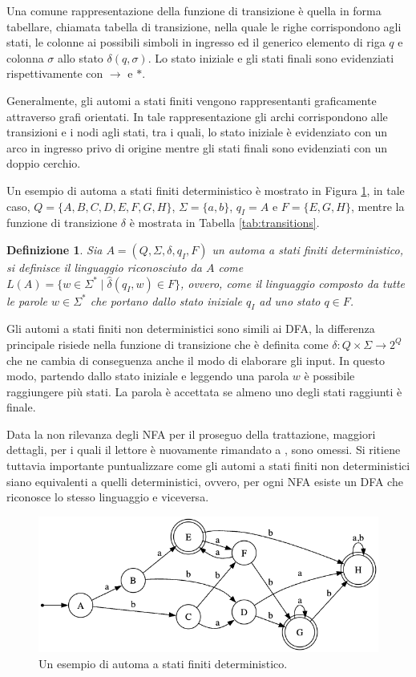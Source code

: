 \documentclass[a4paper,12pt]{report} %
\newtheorem{definition}{Definizione}[chapter] %
\begin{document}
Una comune rappresentazione della funzione di transizione è quella in forma tabellare, chiamata tabella di transizione,
nella quale le righe corrispondono agli stati, le colonne ai possibili simboli in ingresso ed il generico elemento
di riga $q$ e colonna $\sigma$ allo stato $\delta(q, \sigma)$. Lo stato iniziale e gli stati finali sono evidenziati
rispettivamente con $\rightarrow$ e $*$.

Generalmente, gli automi a stati finiti vengono rappresentanti graficamente attraverso grafi orientati.
In tale rappresentazione gli archi corrispondono alle transizioni e i nodi agli stati, tra i quali, lo stato iniziale è
evidenziato con un arco in ingresso privo di origine mentre gli stati finali sono evidenziati con un doppio cerchio.

Un esempio di automa a stati finiti deterministico è mostrato in Figura \ref{fig:dfa}, in tale caso,
$Q = \{A, B, C, D, E, F, G, H\}$, $\Sigma = \{a, b\}$, $q_I = A$ e $F = \{E, G, H\}$, mentre
la funzione di transizione $\delta$ è mostrata in Tabella \ref{tab:transitions}.

\begin{definition}
  \label{def:reg-lang}
  Sia $A = (Q, \Sigma, \delta, q_I, F)$ un automa a stati finiti deterministico, si definisce il \emph{linguaggio
  riconosciuto} da $A$ come $L(A) = \{w \in \Sigma^* \mid \hat{\delta}(q_I, w) \in F\}$, ovvero, come
  il linguaggio composto da tutte le parole $w \in \Sigma^*$ che portano dallo stato iniziale $q_I$ ad
  uno stato $q \in F$.
\end{definition}

Gli automi a stati finiti non deterministici sono simili ai DFA, la differenza principale risiede nella
funzione di transizione che è definita come $\delta: Q \times \Sigma \rightarrow 2^Q$ che ne cambia di
conseguenza anche il modo di elaborare gli input. In questo modo, partendo dallo stato iniziale e leggendo
una parola $w$ è possibile raggiungere più stati. La parola è accettata se almeno uno degli stati raggiunti è
finale.

Data la non rilevanza degli NFA per il proseguo della trattazione, maggiori dettagli, per i quali il lettore è
nuovamente rimandato a \parencite{HMU06}, sono omessi. Si ritiene tuttavia importante puntualizzare come gli automi
a stati finiti non deterministici siano equivalenti a quelli deterministici, ovvero, per ogni NFA esiste un
DFA che riconosce lo stesso linguaggio e viceversa.

\begin{figure}[!htb]
  \centering
  \includegraphics[width=0.7\linewidth]{images/dfa.png}
  \caption{\label{fig:dfa}Un esempio di automa a stati finiti deterministico.}
\end{figure}
\end{document}
